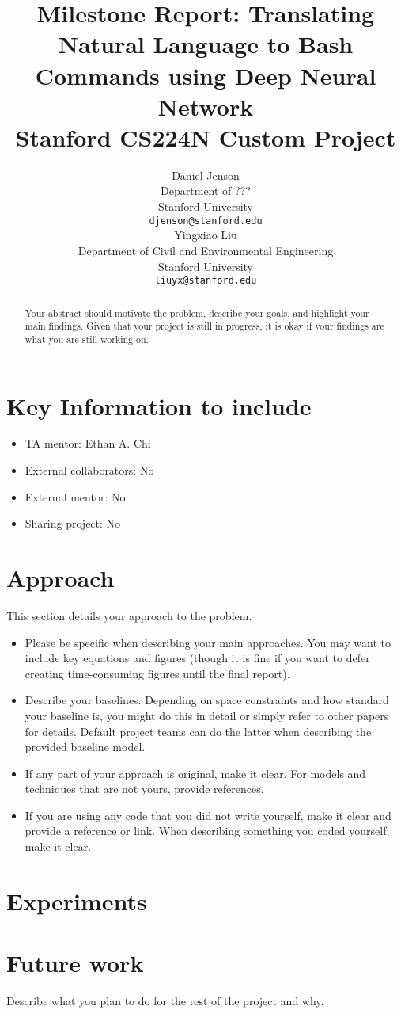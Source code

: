 \documentclass{article}
\title{
  Milestone Report: Translating Natural Language to Bash Commands using Deep Neural Network \\
  \vspace{1em}
  \small{\normalfont Stanford CS224N Custom Project  }
}
\author{
 Daniel Jenson \\
  Department of ??? \\
  Stanford University \\
  \texttt{djenson@stanford.edu} \\
  \And
  Yingxiao Liu \\
  Department of Civil and Environmental Engineering \\
  Stanford University \\
  \texttt{liuyx@stanford.edu} \\
}
\begin{document}
\maketitle

\begin{abstract}
  Your abstract should motivate the problem, describe your goals, and highlight your main findings. Given that your project is still in progress, it is okay if your findings are what you are still working on.
\end{abstract}


\section{Key Information to include}
\begin{itemize}
    \item TA mentor: Ethan A. Chi
    \item External collaborators: No
    \item External mentor: No
    \item Sharing project: No
\end{itemize}


\section{Approach}
This section details your approach to the problem. 
\begin{itemize}
    \item Please be specific when describing your main approaches. You may want to include key equations and figures (though it is fine if you want to defer creating time-consuming figures until the final report).
    \item Describe your baselines. Depending on space constraints and how standard your baseline is, you might do this in detail or simply refer to other papers for details. Default project teams can do the latter when describing the provided baseline model.
    \item If any part of your approach is original, make it clear. For models and techniques that are not yours, provide references.
    \item If you are using any code that you did not write yourself, make it clear and provide a reference or link. 
    When describing something you coded yourself, make it clear.
\end{itemize} 


\section{Experiments}



\section{Future work}
Describe what you plan to do for the rest of the project and why.




\end{document}
